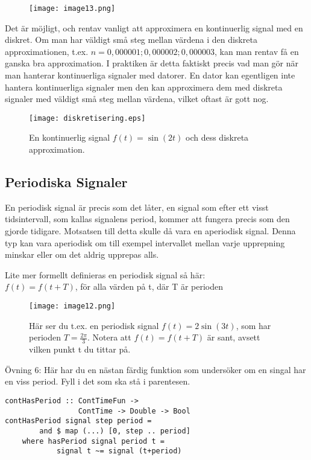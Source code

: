 \documentclass{article}
\begin{document}
\begin{figure}[ht]
\centerline{\texttt{[image: image13.png]}}
\caption{}
\label{}
\end{figure}

Det är möjligt, och rentav vanligt att approximera en kontinuerlig signal med en diskret. Om man har väldigt små steg mellan värdena i den diskreta approximationen, t.ex. $n={0,000001 ; 0,000002 ; 0,000003}$, kan man rentav få en ganska bra approximation. I praktiken är detta faktiskt precis vad man gör när man hanterar kontinuerliga signaler med datorer. En dator kan egentligen inte hantera kontinuerliga signaler men den kan approximera dem med diskreta signaler med väldigt små steg mellan värdena, vilket oftast är gott nog.

\begin{figure}[ht]
\centerline{\texttt{[image: diskretisering.eps]}}
\caption{En kontinuerlig signal $f(t) = \sin(2 t)$ och dess diskreta approximation.}
\label{}
\end{figure}

\subsection{Periodiska Signaler}
En periodisk signal är precis som det låter, en signal som efter ett visst
tidsintervall, som kallas signalens period, kommer att fungera precis som den
gjorde tidigare. Motsatsen till detta skulle då vara en aperiodisk signal.
Denna typ kan vara aperiodisk om till exempel intervallet mellan varje
upprepning minskar eller om det aldrig upprepas alls.

Lite mer formellt definieras en periodisk signal så här:\\
$f(t) = f(t+T)$, för alla värden på t, där T är perioden

\begin{figure}[ht]
\centerline{\texttt{[image: image12.png]}}
\caption{Här ser du t.ex. en periodisk signal $f(t)=2 \sin(3 t)$, som har perioden $T=\frac{2\pi}{3}$. Notera att $f(t)=f(t+T)$ är sant, avsett vilken punkt t du tittar på.}
\label{}
\end{figure}
\newpage
Övning 6: Här har du en nästan färdig funktion som undersöker om en singal har en viss period. Fyll i det som ska stå i parentesen. 
\begin{verbatim}
contHasPeriod :: ContTimeFun -> 
                 ContTime -> Double -> Bool
contHasPeriod signal step period = 
        and $ map (...) [0, step .. period]
    where hasPeriod signal period t = 
            signal t ~= signal (t+period)
\end{verbatim}
\end{document}
